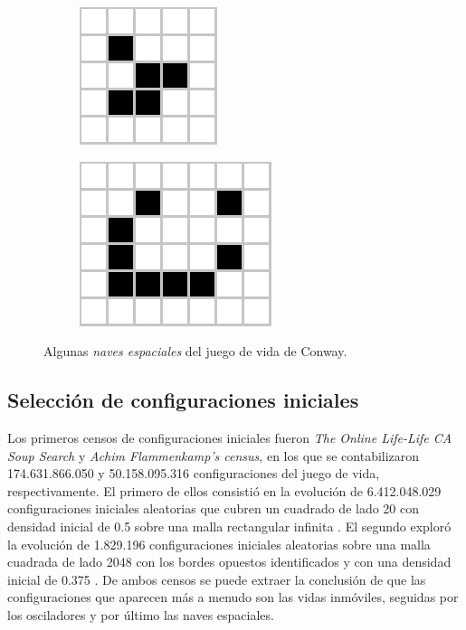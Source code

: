 \documentclass[../proyecto.tex]{memoir}
\begin{document}
\begin{figure}[H]
	\centering
	\begin{subfigure}[b]{0.3\linewidth} 
        \centering
        \includegraphics[height=.35\linewidth]{./images/glider.png}
        \caption{}
        \label{fig:glider}
    \end{subfigure}
    \quad
	\begin{subfigure}[b]{0.3\linewidth} 
        \centering
        \includegraphics[height=0.45\linewidth]{./images/lightweightspaceship.png}
        \caption{}
        \label{fig:lightweightspaceship}
    \end{subfigure}
	\caption{Algunas \textit{naves espaciales} del juego de vida de Conway.}
	\label{fig:congIniciales4}
\end{figure} 


\subsection{Selección de configuraciones iniciales} \label{seleccion}

Los primeros censos de configuraciones iniciales fueron \textit{The Online Life-Life CA Soup Search} y \textit{Achim Flammenkamp's census}, en los que se contabilizaron 174.631.866.050 y 50.158.095.316 configuraciones del juego de vida, respectivamente. El primero de ellos consistió en la evolución de 6.412.048.029 configuraciones iniciales aleatorias que cubren un cuadrado de lado 20 con densidad inicial de 0.5 sobre una malla rectangular infinita \cite{sopa1}. El segundo exploró la evolución de 1.829.196 configuraciones iniciales aleatorias sobre una malla cuadrada de lado 2048 con los bordes opuestos identificados y con una densidad inicial de 0.375 \cite{sopa2}. De ambos censos se puede extraer la conclusión de que las configuraciones que aparecen más a menudo son las vidas inmóviles, seguidas por los osciladores y por último las naves espaciales.
\end{document}
